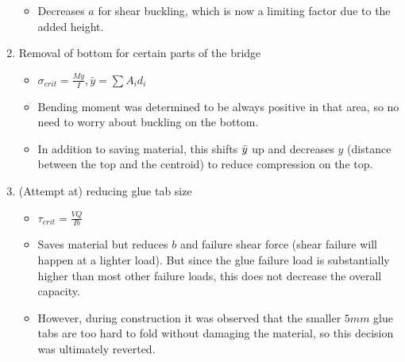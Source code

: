 \documentclass[11pt,twocolumn,letterpaper]{article}
\begin{document}
\begin{enumerate}
\begin{itemize}
        \item Decreases $a$ for shear buckling, which is now a limiting factor due to the added height. 
    \end{itemize}
    \item Removal of bottom for certain parts of the bridge
    \begin{itemize}
        \item $\sigma_{crit} = \frac{My}{I}, \bar{y} = \sum A_id_i$
        \item Bending moment was determined to be always positive in that area, so no need to worry about buckling on the bottom. 
        \item In addition to saving material, this shifts $\Bar{y}$ up and decreases $y$ (distance between the top and the centroid) to reduce compression on the top. 
    \end{itemize}
    \item (Attempt at) reducing glue tab size 
    \begin{itemize}
        \item $\tau_{crit} = \frac{VQ}{Ib}$
        \item Saves material but reduces $b$ and failure shear force (shear failure will happen at a lighter load). But since the glue failure load is substantially higher than most other failure loads, this does not decrease the overall capacity.
        \item However, during construction it was observed that the smaller $5\si{mm}$ glue tabs are too hard to fold without damaging the material, so this decision was ultimately reverted.
    \end{itemize}
\end{enumerate}
    
\end{document}
